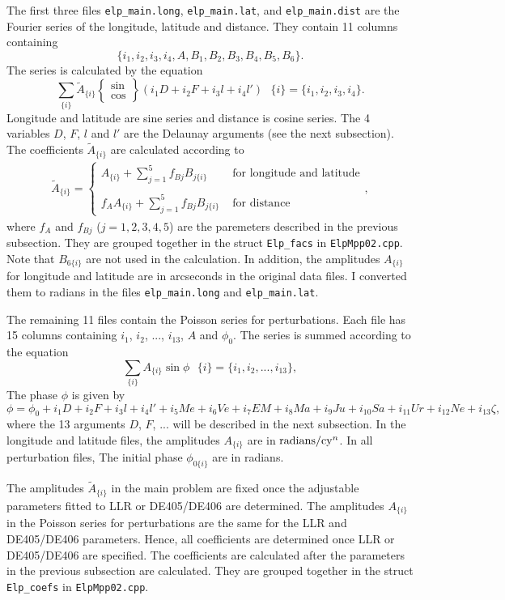 \documentclass[12pt]{article}
\newcommand \beq {\begin{equation}}
\newcommand \eeq {\end{equation}}
\newcommand \beqn {\begin{eqnarray}}
\newcommand \eeqn {\end{eqnarray}}
\begin{document}
The first three files {\tt elp\_main.long}, {\tt elp\_main.lat}, and 
{\tt elp\_main.dist} are the Fourier series of the longitude, latitude and distance. 
They contain 11 columns containing 
\[
\{ i_1, i_2, i_3, i_4, A, B_1, B_2, B_3, B_4, B_5, B_6\} .
\]
The series is calculated by the equation 
\beq
  \sum_{\{ i\} } \tilde{A}_{\{ i \}} \left\{ \begin{array}{l} \sin \\ \cos \end{array}
\right \} 
(i_1 D + i_2 F + i_3 l + i_4 l') \ \ \ \{ i \} = \{ i_1, i_2, i_3, i_4 \} .
\eeq
Longitude and latitude are sine series and distance is cosine series. The 4 variables 
$D$, $F$, $l$ and $l'$ are the Delaunay arguments (see the next subsection). The coefficients 
$\tilde{A}_{\{ i \}}$ are calculated according to 
\beqn
  \tilde{A}_{\{ i \}} = \left \{ \begin{array}{ll} 
A_{\{ i \}} + \sum\limits_{j=1}^5 f_{Bj} B_{j\{ i \}} & \mbox{ for longitude and latitude} \\  \\
f_A A_{\{ i \}} + \sum\limits_{j=1}^5 f_{Bj} B_{j\{ i \}} & \mbox{ for distance} \end{array}\right. ,
\eeqn
where $f_A$ and $f_{Bj}$ ($j=1,2,3,4,5$) are the paremeters described in the previous 
subsection. They are grouped together in the struct {\tt Elp\_facs} in {\tt ElpMpp02.cpp}. 
Note that $B_{6 \{i \}}$ are not used in the calculation. In addition, the amplitudes
$A_{\{ i \}}$ for longitude and latitude are in arcseconds in the original data 
files. I converted them to radians in the files {\tt elp\_main.long} and 
{\tt elp\_main.lat}.

The remaining 11 files contain the Poisson series for perturbations. Each file 
has 15 columns containing $i_1$, $i_2$, ..., $i_{13}$, $A$ and $\phi_0$. The series 
is summed according to the equation 
\beq
  \sum_{\{i\}} A_{\{i\}} \sin \phi \ \ \ \{i\} = \{ i_1, i_2, ..., i_{13} \} ,
\eeq
The phase $\phi$ is given by 
\beq 
  \phi = \phi_0 + i_1 D + i_2 F + i_3 l + i_4 l' + i_5 Me + i_6 Ve + i_7 EM + i_8 Ma 
+ i_9 Ju + i_{10} Sa + i_{11} Ur + i_{12} Ne + i_{13} \zeta ,
\label{eq:phi}
\eeq
where the 13 arguments $D$, $F$, ... will be described in the next subsection. 
In the longitude and latitude files, the amplitudes $A_{\{i\}}$ are in 
${\rm radians}/{\rm cy}^n$. In all perturbation files, The initial phase 
$\phi_{0 \{i \}}$ are in radians.

The amplitudes $\tilde{A}_{\{i\}}$ in the main problem are fixed once the 
adjustable parameters fitted to LLR or DE405/DE406 are determined. The 
amplitudes $A_{\{i\}}$ in the Poisson series 
for perturbations are the same for the LLR and DE405/DE406 parameters. Hence, all 
coefficients are determined once LLR or DE405/DE406 are specified. The coefficients 
are calculated after the parameters in the previous subsection are calculated. 
They are grouped together in the struct {\tt Elp\_coefs} in {\tt ElpMpp02.cpp}. 
\end{document}
